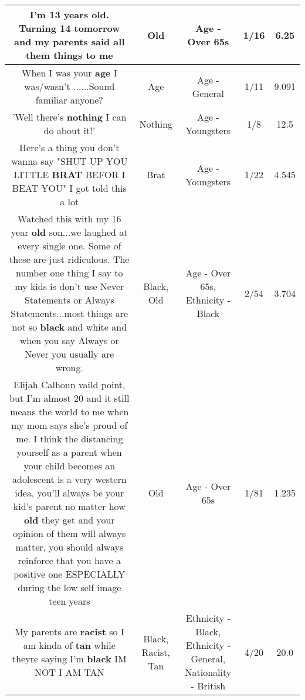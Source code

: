 \documentclass[11pt]{article}
\newlength\mylength
\begin{document}
\begin{center}
\begin{longtable}{|C{.65\mylength}|C{.30\mylength}|C{.12\mylength}|C{.12\mylength}|C{.12\mylength}|}
  \small I'm 13 years \textbf{old}. Turning 14 tomorrow and my parents said all them things to me\normalsize   & Old & Age - Over 65s & 1/16 & 6.25 \\  \hline
  \small When I was your \textbf{age} I was/wasn't ......Sound familiar anyone?\normalsize   & Age & Age - General & 1/11 & 9.091 \\  \hline
  \small 'Well there's \textbf{nothing} I can do about it!'\normalsize   & Nothing & Age - Youngsters & 1/8 & 12.5 \\  \hline
  \small Here's a thing you don't wanna say "SHUT UP YOU LITTLE \textbf{BRAT} BEFOR I BEAT YOU" I got told this a lot\normalsize   & Brat & Age - Youngsters & 1/22 & 4.545 \\  \hline
  \small Watched this with my 16 year \textbf{old} son...we laughed at every single one. Some of these are just ridiculous. The number one thing I say to my kids is don't use Never Statements or Always Statements...most things are not so \textbf{black} and white and when you say Always or Never you usually are wrong.\normalsize   & Black, Old & Age - Over 65s, Ethnicity - Black & 2/54 & 3.704 \\  \hline
  \small Elijah Calhoun vaild point, but I'm almost 20 and it still means the world to me when my mom says she's proud of me. I think the distancing yourself as a parent when your child becomes an adolescent is a very western idea, you'll always be your kid's parent no matter how \textbf{old} they get and your opinion of them will always matter, you should always reinforce that you have a positive one ESPECIALLY during the low self image teen years\normalsize   & Old & Age - Over 65s & 1/81 & 1.235 \\  \hline
  \small My parents are \textbf{racist} so I am kinda of \textbf{tan} while theyre saying I'm \textbf{black} IM NOT I AM TAN\normalsize   & Black, Racist, Tan & Ethnicity - Black, Ethnicity - General, Nationality - British & 4/20 & 20.0 \\  \hline

\end{longtable}
\end{center}
\end{document}

